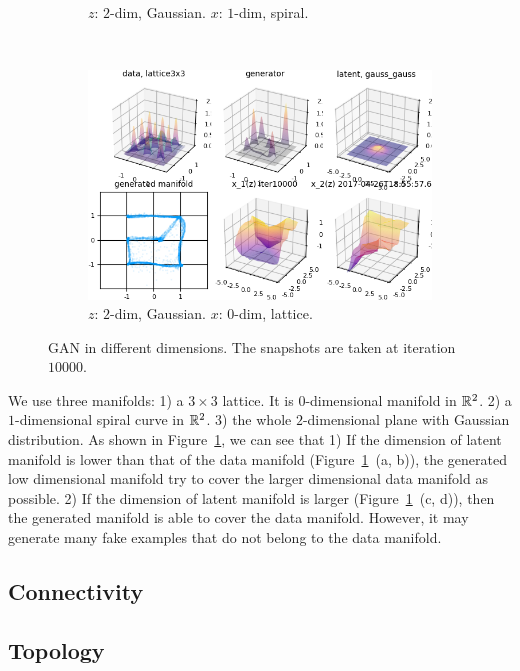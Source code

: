 \begin{figure}[ht]
\begin{subfigure}[t]{0.45\textwidth}
        \caption{$z$: $2$-dim, Gaussian.
            $x$: $1$-dim, spiral.}
    \end{subfigure}
    ~
    \begin{subfigure}[t]{0.45\textwidth}
        \includegraphics[width=\linewidth]{"fig/gaussgauss_lattice3x3_000100"}
        \caption{$z$: $2$-dim, Gaussian.
            $x$: $0$-dim, lattice.}
    \end{subfigure}
    \caption{\small
        GAN in different dimensions.
        The snapshots are taken at iteration $10000$.
        }
    \label{fig:dim}
\end{figure}

We use three manifolds:
1) a $3\times3$ lattice. It is $0$-dimensional manifold in ${\mathbb{R}}^2$.
2) a $1$-dimensional spiral curve in ${\mathbb{R}}^2$.
3) the whole $2$-dimensional plane with Gaussian distribution.
As shown in Figure~\ref{fig:dim},
we can see that
1) If the dimension of latent manifold is lower than that of the data manifold
(Figure~\ref{fig:dim}~(a, b)),
the generated low dimensional manifold try to cover the
larger dimensional data manifold as possible.
2) If the dimension of latent manifold is larger (Figure~\ref{fig:dim}~(c, d)),
then the generated manifold is able to cover the data manifold.
However,
it may generate many fake examples that do not belong to the data manifold.

\subsection{Connectivity}

\subsection{Topology}

